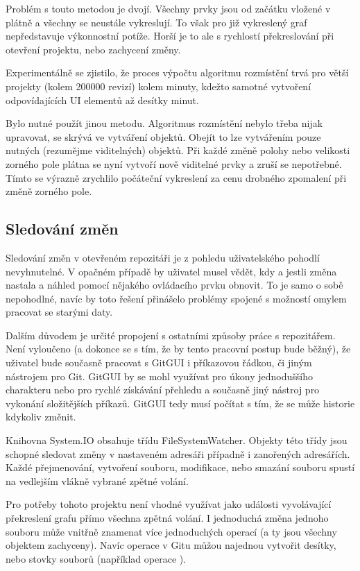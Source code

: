\documentclass[
  biblatex,
  glossaries,
  index
]{kidiplom}
\begin{document}
Problém s touto metodou je dvojí. Všechny prvky jsou od začátku vložené v plátně a všechny se neustále vykreslují. To však pro již vykreslený graf nepředstavuje výkonnostní potíže. Horší je to ale s rychlostí překreslování při otevření projektu, nebo zachycení změny.

Experimentálně se zjistilo, že proces výpočtu algoritmu rozmístění trvá pro větší projekty (kolem 200000 revizí) kolem minuty, kdežto samotné vytvoření odpovídajících UI elementů až desítky minut.

Bylo nutné použít jinou metodu. Algoritmus rozmístění nebylo třeba nijak upravovat,  se skrývá ve vytváření objektů. Obejít to lze vytvářením pouze nutných (rezumějme viditelných) objektů. Při každé změně polohy nebo velikosti zorného pole plátna se nyní vytvoří nově viditelné prvky a zruší se nepotřebné. Tímto se výrazně zrychlilo počáteční vykreslení za cenu drobného zpomalení při změně zorného pole.

\subsection{Sledování změn}
Sledování změn v otevřeném repozitáři je z pohledu uživatelského pohodlí nevyhnutelné. V opačném případě by uživatel musel vědět, kdy a jestli změna nastala a náhled pomocí nějakého ovládacího prvku obnovit. To je samo o sobě nepohodlné, navíc by toto řešení přinášelo problémy spojené s možností omylem pracovat se starými daty.

Dalším důvodem je určité propojení s ostatními způsoby práce s repozitářem. Není vyloučeno (a dokonce se s tím, že by tento pracovní postup bude běžný), že uživatel bude současně pracovat s GitGUI i příkazovou řádkou, či jiným nástrojem pro Git. GitGUI by se mohl využívat pro úkony jednoduššího charakteru nebo pro rychlé získávání přehledu a současně jiný nástroj pro vykonání složitějších příkazů.
GitGUI tedy musí počítat s tím, že se může historie kdykoliv změnit.

Knihovna System.IO obsahuje třídu FileSystemWatcher. Objekty této třídy jsou schopné sledovat změny v nastaveném adresáři případně i zanořených adresářích. Každé přejmenování, vytvoření souboru, modifikace, nebo smazání souboru spustí na vedlejším vlákně vybrané zpětné volání.

Pro potřeby tohoto projektu není vhodné využívat jako události vyvolávající překreslení grafu přímo všechna zpětná volání. I jednoduchá změna jednoho souboru může vnitřně znamenat více jednoduchých operací (a ty jsou všechny objektem zachyceny). Navíc operace v Gitu můžou najednou vytvořit desítky, nebo stovky souborů (například operace ).
\end{document}
